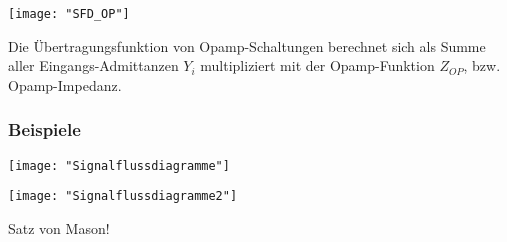 
\begin{minipage}[t]{0.3\textwidth}
	\vspace{0pt}								%
	\texttt{[image: "SFD\_OP"]}
\end{minipage}\hspace{0.05\textwidth}
\begin{minipage}[t]{0.6\textwidth}
	\vspace{0pt}
	Die Übertragungsfunktion von Opamp-Schaltungen berechnet sich als Summe aller Eingangs-Admittanzen $Y_i$ multipliziert mit der
	Opamp-Funktion $Z_{OP}$, bzw. Opamp-Impedanz.
\end{minipage}
\vspace{2mm}



\subsubsection{Beispiele}
\begin{minipage}[t]{0.3\textwidth}
	\vspace{0pt}								%
	\texttt{[image: "Signalflussdiagramme"]}
\end{minipage}\hspace{0.05\textwidth}
\begin{minipage}[t]{0.3\textwidth}
	\vspace{0pt}
	\texttt{[image: "Signalflussdiagramme2"]}
\end{minipage}
\begin{minipage}[t]{0.3\textwidth}
	\vspace{0pt}
	Satz von Mason!
\end{minipage}
\vspace{2mm}


